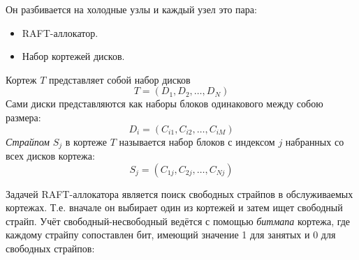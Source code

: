 \documentclass[a4paper,12pt]{article}
\begin{document}
    Он разбивается на холодные узлы и каждый узел это пара:
    \begin{itemize}
        \item RAFT-аллокатор.
        \item Набор кортежей дисков.
    \end{itemize}

    Кортеж $T$ представляет собой набор дисков
    \[T=\left( D_1, D_2, \dots, D_N \right)\]
    Сами диски представляются как наборы блоков одинакового между собою размера:
    \[D_i = \left( C_{i1}, C_{i2}, \dots, C_{iM} \right)\]
    \textit{Страйпом} $S_j$ в кортеже $T$ называется набор блоков с индексом $j$ набранных со всех дисков кортежа:
    \[S_j = \left( C_{1j}, C_{2j}, \dots, C_{Nj} \right)\]

    Задачей RAFT-аллокатора является поиск свободных страйпов в обслуживаемых кортежах. Т.е. вначале он выбирает один из кортежей и затем ищет свободный страйп.
    Учёт свободный-несвободный ведётся с помощью \textit{битмапа} кортежа, где каждому страйпу сопоставлен бит, имеющий значение 1 для занятых и 0 для свободных
    страйпов:
\end{document}
